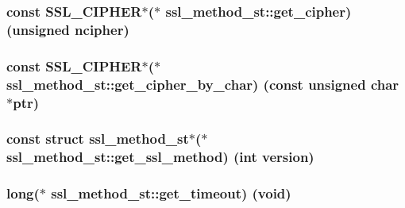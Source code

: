 \subsubsection[{\texorpdfstring{get\+\_\+cipher}{get_cipher}}]{\setlength{\rightskip}{0pt plus 5cm}const {\bf S\+S\+L\+\_\+\+C\+I\+P\+H\+ER}$\ast$($\ast$ ssl\+\_\+method\+\_\+st\+::get\+\_\+cipher) (unsigned ncipher)}\hypertarget{structssl__method__st_aa5b037fbac753dc98291d099d817a072}{}\label{structssl__method__st_aa5b037fbac753dc98291d099d817a072}
\subsubsection[{\texorpdfstring{get\+\_\+cipher\+\_\+by\+\_\+char}{get_cipher_by_char}}]{\setlength{\rightskip}{0pt plus 5cm}const {\bf S\+S\+L\+\_\+\+C\+I\+P\+H\+ER}$\ast$($\ast$ ssl\+\_\+method\+\_\+st\+::get\+\_\+cipher\+\_\+by\+\_\+char) (const unsigned char $\ast$ptr)}\hypertarget{structssl__method__st_a51d27641af1ef292ad991acab889eb69}{}\label{structssl__method__st_a51d27641af1ef292ad991acab889eb69}
\subsubsection[{\texorpdfstring{get\+\_\+ssl\+\_\+method}{get_ssl_method}}]{\setlength{\rightskip}{0pt plus 5cm}const struct {\bf ssl\+\_\+method\+\_\+st}$\ast$($\ast$ ssl\+\_\+method\+\_\+st\+::get\+\_\+ssl\+\_\+method) (int {\bf version})}\hypertarget{structssl__method__st_a601499546a57b7fc73461cca2588a316}{}\label{structssl__method__st_a601499546a57b7fc73461cca2588a316}
\subsubsection[{\texorpdfstring{get\+\_\+timeout}{get_timeout}}]{\setlength{\rightskip}{0pt plus 5cm}long($\ast$ ssl\+\_\+method\+\_\+st\+::get\+\_\+timeout) (void)}\hypertarget{structssl__method__st_a5a153fd1d3f82198c14ceca526c07efa}{}\label{structssl__method__st_a5a153fd1d3f82198c14ceca526c07efa}
